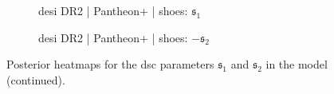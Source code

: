 \begin{figure}[p]
    \vspace{0.35em}

    \begin{subfigure}[t]{0.49\textwidth}
        \centering
        \caption{\gls{desi} DR2 | Pantheon+ | \gls{shoes}: $\mathfrak{s}_1$}
        \label{fig:HyperbolicdSCHeatmap:PPSDS1}
    \end{subfigure}
    \hfill
    \begin{subfigure}[t]{0.49\textwidth}
        \centering
        \caption{\gls{desi} DR2 | Pantheon+ | \gls{shoes}: $-\mathfrak{s}_2$}
        \label{fig:HyperbolicdSCHeatmap:PPSDS2}
    \end{subfigure}

    \tagstructend
    \caption[Posterior heatmaps for dSC parameters (continued).]{Posterior heatmaps for the \gls{dsc} parameters $\mathfrak{s}_1$ and $\mathfrak{s}_2$ in the  model (continued).}
\end{figure}